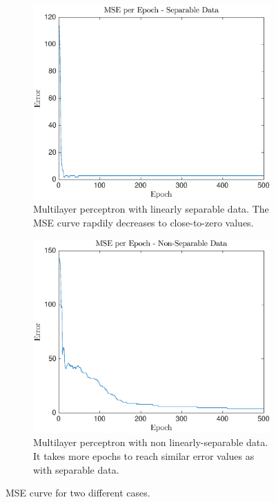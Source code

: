 \documentclass[letterpaper, 10 pt, conference]{ieeeconf}  %
\begin{document}
\begin{figure}
    \centering
    \begin{subfigure}[b]{0.49\textwidth}
        \includegraphics[width=\textwidth]{backprops}
        \caption{Multilayer perceptron with linearly separable data. The MSE curve rapdily decreases to close-to-zero values.}
        \label{fig:s}
    \end{subfigure}
    \begin{subfigure}[b]{0.49\textwidth}
        \includegraphics[width=\textwidth]{backpropns}
        \caption{Multilayer perceptron with non linearly-separable data. It takes more epochs to reach similar error values as with separable data.}
        \label{fig:ns}
    \end{subfigure}
    \caption{MSE curve for two different cases.}
    \label{f:2}
\end{figure}
\end{document}
